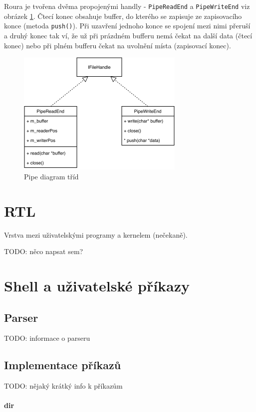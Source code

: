 \documentclass[11pt,a4paper]{scrartcl}
\begin{document}
	Roura je tvořena dvěma propojenými handly - \verb|PipeReadEnd| a \verb|PipeWriteEnd| viz obrázek \ref{fig:pipe-c}. Čtecí konec obsahuje buffer, do kterého se zapisuje ze zapisovacího konce (metoda \verb|push()|). Při uzavření jednoho konce se spojení mezi nimi přeruší a druhý konec tak ví, že už při prázdném bufferu nemá čekat na další data (čtecí konec) nebo při plném bufferu čekat na uvolnění místa (zapisovací konec).
	
	\begin{figure}[H]
		\centering
		\includegraphics[width=8cm]{pipe-c.pdf}
		\caption{Pipe diagram tříd}
		\label{fig:pipe-c}
	\end{figure}
	
	\section{RTL}
	Vrstva mezi uživatelskými programy a kernelem (nečekaně).
	
	TODO: něco napsat sem?
	
	\section{Shell a uživatelské příkazy}
	
	\subsection{Parser}
	TODO: informace o parseru
	
	\subsection{Implementace příkazů}
	TODO: nějaký krátký info k příkazům
	
	\paragraph{dir}
	
\end{document}
